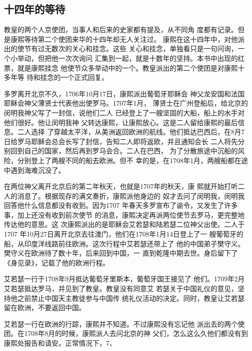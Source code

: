 \subsection{十四年的等待}
\par
教皇的两个人京使团，当事人和后来的史家都有提及，从不同角%
度都有记录。但是康熙等待第二个使团来华的十四年却无人关注过。%
康熙在这十四年中，对他派出的使节有过无数次的关心和挂念。这些%
关心和挂念，单独看只是一句问询，一个小举动，但把他一次次询问%
汇集到一起，就是十数年的坚持。本书中出现的红票，就是康熙挂念%
他使节众多举动中的一个。教皇派出的第二个使团是对康熙十多年等%
待和挂念的一个正式回复。%
\par
多罗离开北京不久，1706年10月17日，康熙派出葡萄牙耶稣会%
神父龙安国和法国耶稣会神父薄贤士代表他出使罗马。1707年1月，%
薄贤士在广州登船后，给北京的闵明我神父写了一封信，说他们二人%
已经登上了一艘坚固的大船，船上的水手对他们很好。他让闵明我神%
父转达康熙，让康熙放心。这是二人留给康熙的最后信息。二人选择%
了穿越太平洋，从美洲返回欧洲的航线。他们抵达巴西后，在8月7%
日给罗马耶稣会总会长写了封信，告知二人即将返欧，并且通知会长%
二人将先分别回到自己的国家，然后再到罗马会合。二人在巴西，%
为了分散旅途中沉船的风险，分别登上了两艘不同的船去欧洲。但不%
幸的是，在1708年1月，两艘船都在途中遇到海难沉没了。%
\par
在两位神父离开北京后的第二年秋天，也就是1707年的秋天，康%
熙就开始打听二人的消息了。根据现存的满文奏折，康熙派他身边的%
奴才去问了闵明我，闵明我回答他什么信息都没有收到。因为1707%
年春天多罗宣布了谕令，又发生了许多事，加上还没有收到前次使节%
的消息，康熙决定再派两位使节去罗马，更完整地传达他的意思。这%
次康熙派出的是耶稣会艾若瑟和陆若瑟二位神父出使。二人于1707%
年10月27日离开北京去往澳门，他们在1708年1月14日登上了一%
艘葡萄牙的船，从印度洋线路前往欧洲。这次行程中艾若瑟还带上了%
他的中国弟子樊守义。樊守义在欧洲待了数十年，后来回到中国，一%
直到乾隆中期去世。身后留下了《身见录》，记载了他的欧洲行程。%
\par
艾若瑟一行于1708年9月抵达葡萄牙里斯本，葡萄牙国王接见了%
他们。1709年2月艾若瑟抵达罗马，并见到了教皇。教皇没有同意艾%
若瑟关于中国礼仪的意见，坚持他之前禁止中国天主教徒参与中国传%
统礼仪活动的决定。同时，教皇让艾若瑟留在欧洲，不要返回中国。%
\par
艾若瑟一行在欧洲的行踪，康熙并不知道。不过康熙没有忘记他%
派出去的两个使团。在1708年8月的时候，康熙派人去问北京的神%
父们，怎么这么久他们都没有到康熙处报告和请安。正常情况下，7、%
